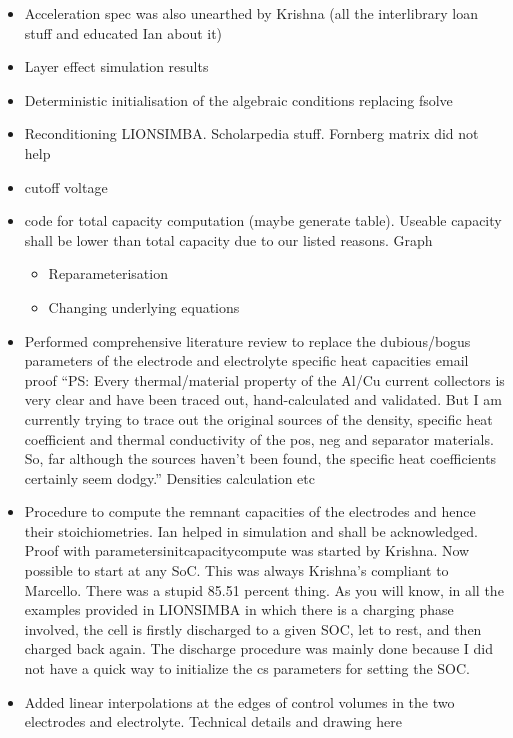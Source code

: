 \begin{itemize}
    \item Acceleration spec was also unearthed by Krishna (all the interlibrary loan stuff and educated Ian about it)
    \item Layer effect simulation results
    \item Deterministic initialisation of the algebraic conditions replacing fsolve
    \item Reconditioning LIONSIMBA. Scholarpedia stuff. Fornberg matrix did not help
    \item cutoff voltage
    \item code for total capacity computation (maybe generate table). Useable capacity shall be lower than total capacity due to our listed reasons. Graph
        \begin{itemize}
            \item Reparameterisation
            \item Changing underlying equations
        \end{itemize}
    \item Performed comprehensive literature review to replace the dubious/bogus parameters of the electrode and electrolyte specific heat capacities email proof ``PS: Every thermal/material property of the Al/Cu current collectors is very clear and have been traced out, hand-calculated and validated.
         But I am currently trying to trace out the original sources of the density, specific heat coefficient and thermal conductivity of the pos, neg and separator materials.  So, far although the sources haven’t been found, the specific heat coefficients certainly seem dodgy.'' Densities calculation etc
     \item Procedure to compute the remnant capacities of the electrodes and hence their stoichiometries. Ian helped in simulation and shall be acknowledged. Proof with parametersinitcapacitycompute was started by Krishna. Now possible to start at any SoC. This was always Krishna's compliant to Marcello. There was a stupid 85.51 percent thing. As you will know, in all the examples provided in LIONSIMBA in which there is a charging phase involved, the cell is firstly discharged to a given SOC, let to rest, and then charged back again. The discharge procedure was mainly done because I did not have a quick way to initialize the cs parameters for setting the SOC.
    \item Added linear interpolations at the edges of control volumes in the two electrodes and electrolyte. Technical details and drawing here

\end{itemize}
